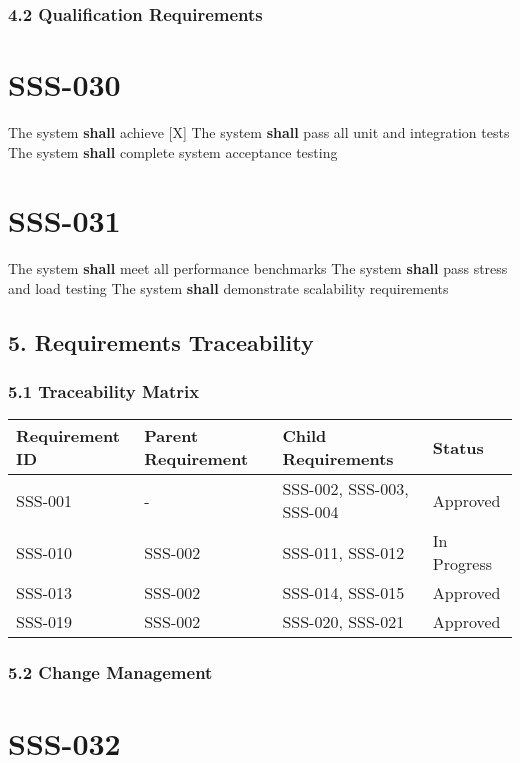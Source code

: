 \subsubsection{4.2 Qualification Requirements}

\section{SSS-030}\label{SSS-030}

The system \textbf{shall} achieve [X]%
The system \textbf{shall} pass all unit and integration tests
The system \textbf{shall} complete system acceptance testing

\section{SSS-031}\label{SSS-031}

The system \textbf{shall} meet all performance benchmarks
The system \textbf{shall} pass stress and load testing
The system \textbf{shall} demonstrate scalability requirements

\subsection{5. Requirements Traceability}

\subsubsection{5.1 Traceability Matrix}

\begin{longtable}{|l|l|l|l|}
 Requirement ID & Parent Requirement & Child Requirements & Status \\
\hline
 SSS-001 & - & SSS-002, SSS-003, SSS-004 & Approved \\
 SSS-010 & SSS-002 & SSS-011, SSS-012 & In Progress \\
 SSS-013 & SSS-002 & SSS-014, SSS-015 & Approved \\
 SSS-019 & SSS-002 & SSS-020, SSS-021 & Approved \\
\end{longtable}

\subsubsection{5.2 Change Management}

\section{SSS-032}\label{SSS-032}

